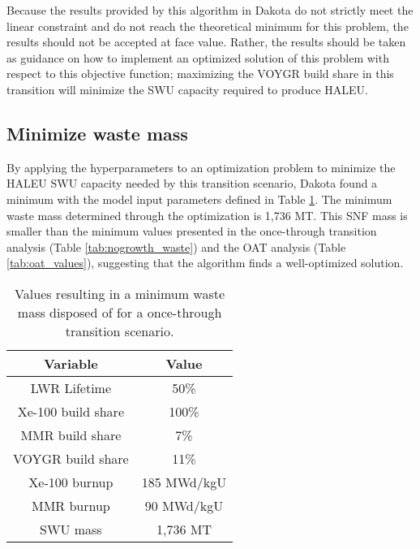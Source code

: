Because the results provided by this algorithm in Dakota do not strictly 
meet the linear constraint and do not reach the theoretical minimum for 
this problem, the results should not be accepted at face value. 
Rather, the results should be taken as guidance on how to implement an 
optimized solution of this problem 
with respect to this objective function; maximizing the VOYGR build share in 
this transition will minimize the \gls{SWU} capacity required to produce 
\gls{HALEU}.  

\subsection{Minimize waste mass}
By applying the hyperparameters to an optimization problem to minimize the 
\gls{HALEU} \gls{SWU} capacity needed by this transition scenario, Dakota
found a minimum with the model input parameters defined in Table 
\ref{tab:soga_ot_waste}. The minimum waste mass determined through the 
optimization is 1,736 MT. This \gls{SNF} mass is smaller than the minimum 
values presented in the once-through transition 
analysis (Table \ref{tab:nogrowth_waste}) and the \gls{OAT} analysis 
(Table \ref{tab:oat_values}), suggesting that the algorithm finds 
a well-optimized solution. 

\begin{table}[h!]
    \centering 
    \caption{Values resulting in a minimum waste mass disposed of for 
              a once-through transition scenario.}
    \label{tab:soga_ot_waste}
    \begin{tabular}{c c}
        \hline
        Variable & Value \\
        \hline
        LWR Lifetime & 50\%\\
        Xe-100 build share & 100\%\\
        MMR build share & 7\%\\
        VOYGR build share & 11\%\\
        Xe-100 burnup & 185 MWd/kgU\\
        MMR burnup & 90 MWd/kgU\\
        \hline
        SWU mass & 1,736 MT \\
        \hline
    \end{tabular}
\end{table}

